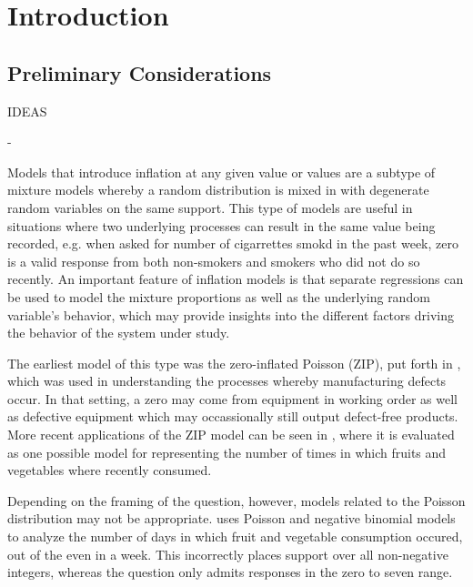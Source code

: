 \chapter{Introduction}
\label{cap:introduction}

\section{Preliminary Considerations}
\label{sec:introduction_preliminary-considerations}

IDEAS

- 

Models that introduce inflation at any given value or values are a subtype of mixture models whereby a random distribution is mixed in with degenerate random variables on the same support. This type of models are useful in situations where two underlying processes can result in the same value being recorded, e.g. when asked for number of cigarrettes smokd in the past week, zero is a valid response from both non-smokers and smokers who did not do so recently. An important feature of inflation models is that separate regressions can be used to model the mixture proportions as well as the underlying random variable's behavior, which may provide insights into the different factors driving the behavior of the system under study.

The earliest model of this type was the zero-inflated Poisson (ZIP), put forth in \cite{lambert1992zero}, which was used in understanding the processes whereby manufacturing defects occur. In that setting, a zero may come from equipment in working order as well as defective equipment which may occassionally still output defect-free products. More recent applications of the ZIP model can be seen in \cite{wang2017availability}, where it is evaluated as one possible model for representing the number of times in which fruits and vegetables where recently consumed.

Depending on the framing of the question, however, models related to the Poisson distribution may not be appropriate. \cite{yen2011fruit} uses Poisson and negative binomial models to analyze the number of days in which fruit and vegetable consumption occured, out of the even in a week. This incorrectly places support over all non-negative integers, whereas the question only admits responses in the zero to seven range.

